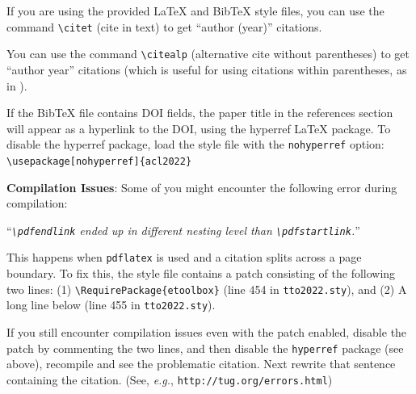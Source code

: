 \documentclass[11pt,a4paper]{article}
\begin{document}
If you are using the provided \LaTeX{} and Bib\TeX{} style files, you
can use the command \verb|\citet| (cite in text)
to get ``author (year)'' citations.

You can use the command \verb|\citealp| (alternative cite without 
parentheses) to get ``author year'' citations (which is useful for 
using citations within parentheses, as in \citealp{Gusfield:97}).

If the Bib\TeX{} file contains DOI fields, the paper
title in the references section will appear as a hyperlink
to the DOI, using the hyperref \LaTeX{} package.
To disable the hyperref package, load the style file
with the \verb|nohyperref| option: \\{\small
\verb|\usepackage[nohyperref]{acl2022}|}

\textbf{Compilation Issues}: Some of you might encounter the following error during compilation: 

``{\em \verb|\pdfendlink| ended up in different nesting level than \verb|\pdfstartlink|.}''

This happens when \verb|pdflatex| is used and a citation splits across a page boundary. To fix this, the style file contains a patch consisting of the following two lines: (1) \verb|\RequirePackage{etoolbox}| (line 454 in \texttt{tto2022.sty}), and (2) A long line below (line 455 in \texttt{tto2022.sty}).

If you still encounter compilation issues even with the patch enabled, disable the patch by commenting the two lines, and then disable the \verb|hyperref| package (see above), recompile and see the problematic citation.
Next rewrite that sentence containing the citation. (See, {\em e.g.}, {\small\tt http://tug.org/errors.html})


\end{document}
